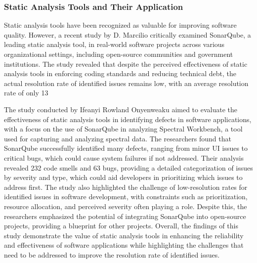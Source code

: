 \subsubsection*{Static Analysis Tools and Their Application}
Static analysis tools have been recognized as valuable for improving software quality. However, a recent study by D. Marcilio \cite{marcilio2019static} critically examined SonarQube, a leading static analysis tool, in real-world software projects across various organizational settings, including open-source communities and government institutions. The study revealed that despite the perceived effectiveness of static analysis tools in enforcing coding standards and reducing technical debt, the actual resolution rate of identified issues remains low, with an average resolution rate of only 13%
\par
The study conducted by Ifeanyi Rowland Onyenweaku \cite{onyenweaku2021sonarqube} aimed to evaluate the effectiveness of static analysis tools in identifying defects in software applications, with a focus on the use of SonarQube in analyzing Spectral Workbench, a tool used for capturing and analyzing spectral data. The researchers found that SonarQube successfully identified many defects, ranging from minor UI issues to critical bugs, which could cause system failures if not addressed. Their analysis revealed 232 code smells and 63 bugs, providing a detailed categorization of issues by severity and type, which could aid developers in prioritizing which issues to address first. The study also highlighted the challenge of low-resolution rates for identified issues in software development, with constraints such as prioritization, resource allocation, and perceived severity often playing a role. Despite this, the researchers emphasized the potential of integrating SonarQube into open-source projects, providing a blueprint for other projects. Overall, the findings of this study demonstrate the value of static analysis tools in enhancing the reliability and effectiveness of software applications while highlighting the challenges that need to be addressed to improve the resolution rate of identified issues.
